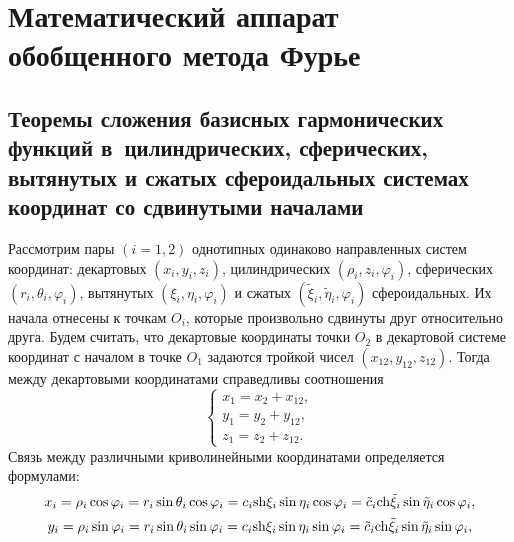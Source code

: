
\chapter{Математический аппарат обобщенного метода Фурье}

\section{Теоремы сложения базисных гармонических функций в~цилиндрических, сферических, вытянутых и сжатых сфероидальных системах координат со сдвинутыми началами}

Рассмотрим пары $(i = 1,2)$ однотипных одинаково направленных систем координат: декартовых $\left( {{x_i},{y_i},{z_i}} \right)$, цилиндрических $\left( {{\rho _i},{z_i},{\varphi _i}} \right)$, сферических $\left( {{r_i},{\theta _i},{\varphi _i}} \right)$, вытянутых $\left( {{\xi _i},{\eta _i},{\varphi _i}} \right)$ и сжатых $\left( {{{\tilde \xi }_i},{{\tilde \eta }_i},{\varphi _i}} \right)$ сфероидальных. Их начала отнесены к точкам ${O_i}$, которые произвольно сдвинуты друг относительно друга. Будем считать, что декартовые координаты точки ${O_2}$ в декартовой системе координат с началом в точке ${O_1}$ задаются тройкой чисел $\left( {{x_{12}},{y_{12}},{z_{12}}} \right)$. Тогда между декартовыми координатами справедливы соотношения\sloppy
\begin{equation}\label{eq:1:1}
\left\{ {\begin{array}{*{20}{l}}
{{x_1} = {x_2} + {x_{12}},}\\
{{y_1} = {y_2} + {y_{12}},}\\
{{z_1} = {z_2} + {z_{12}}.}
\end{array}} \right.
\end{equation}
Связь между различными криволинейными координатами определяется формулами:
\begin{equation*}
{x_i} = {\rho _i}\cos {\varphi _i} = {r_i}\sin {\theta _i}\cos {\varphi _i} = {c_i}{\mathop{\rm sh}\nolimits} {\xi _i}\sin {\eta _i}\cos {\varphi _i} = {\tilde c_i}{\mathop{\rm ch}\nolimits} {\tilde \xi _i}\sin {\tilde \eta _i}\cos {\varphi _i},
\end{equation*}
\begin{equation*}
{y_i} = {\rho _i}\sin {\varphi _i} = {r_i}\sin {\theta _i}\sin {\varphi _i} = {c_i}{\mathop{\rm sh}\nolimits} {\xi _i}\sin {\eta _i}\sin {\varphi _i} = {\tilde c_i}{\mathop{\rm ch}\nolimits} {\tilde \xi _i}\sin {\tilde \eta _i}\sin {\varphi _i},
\end{equation*}
